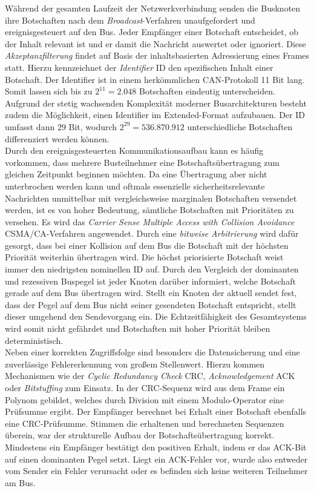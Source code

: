 Während der gesamten Laufzeit der Netzwerkverbindung senden die Busknoten ihre Botschaften nach dem \emph{Broadcast}-Verfahren unaufgefordert und ereignisgesteuert auf den Bus. Jeder Empfänger einer Botschaft entscheidet, ob der Inhalt relevant ist und er damit die Nachricht auswertet oder ignoriert. Diese \emph{Akzeptanzfilterung} findet auf Basis der inhaltsbasierten Adressierung eines Frames statt. Hierzu kennzeichnet der \emph{Identifier} \acs{ID} den spezifischen Inhalt einer Botschaft. Der Identifier ist in einem herkömmlichen \acs{CAN}-Protokoll 11 Bit lang. Somit lassen sich bis zu $2^{11} = 2.048$ Botschaften eindeutig unterscheiden. Aufgrund der stetig wachsenden Komplexität moderner Busarchitekturen besteht zudem die Möglichkeit, einen Identifier im Extended-Format aufzubauen. Der \acs{ID} umfasst dann 29 Bit, wodurch $2^{29} = 536.870.912$ unterschiedliche Botschaften differenziert werden können.\\
Durch den ereignisgesteuerten Kommunikationsaufbau kann es häufig vorkommen, dass mehrere Busteilnehmer eine Botschaftsübertragung zum gleichen Zeitpunkt beginnen möchten. Da eine Übertragung aber nicht unterbrochen werden kann und oftmals essenzielle sicherheitsrelevante Nachrichten unmittelbar mit vergleichsweise marginalen Botschaften versendet werden, ist es von hoher Bedeutung, sämtliche Botschaften mit Prioritäten zu versehen. Es wird das \emph{Carrier Sense Multiple Access with Collision Avoidance} \acs{CSMA/CA}-Verfahren angewendet. Durch eine \emph{bitweise Arbitrierung} wird dafür gesorgt, dass bei einer Kollision auf dem Bus die Botschaft mit der höchsten Priorität weiterhin übertragen wird. Die höchst priorisierte Botschaft weist immer den niedrigsten nominellen \acs{ID} auf. Durch den Vergleich der dominanten und rezessiven Buspegel ist jeder Knoten darüber informiert, welche Botschaft gerade auf dem Bus übertragen wird. Stellt ein Knoten der aktuell sendet fest, dass der Pegel auf dem Bus nicht seiner gesendeten Botschaft entspricht, stellt dieser umgehend den Sendevorgang ein. Die Echtzeitfähigkeit des Gesamtsystems wird somit nicht gefährdet und Botschaften mit hoher Priorität bleiben deterministisch. \\
Neben einer korrekten Zugriffsfolge sind besonders die Datensicherung und eine zuverlässige Fehlererkennung von großem Stellenwert. Hierzu kommen Mechanismen wie der \emph{Cyclic Redundancy Check} \acs{CRC}, \emph{Acknowledgement} \acs{ACK} oder \emph{Bitstuffing} zum Einsatz. In der \acs{CRC}-Sequenz wird aus dem Frame ein Polynom gebildet, welches durch Division mit einem Modulo-Operator eine Prüfsumme ergibt. Der Empfänger berechnet bei Erhalt einer Botschaft ebenfalls eine \acs{CRC}-Prüfsumme. Stimmen die erhaltenen und berechneten Sequenzen überein, war der strukturelle Aufbau der Botschaftsübertragung korrekt. Mindestens ein Empfänger bestätigt den positiven Erhalt, indem er das \acs{ACK}-Bit auf einen dominanten Pegel setzt. Liegt ein \acs{ACK}-Fehler vor, wurde also entweder vom Sender ein Fehler verursacht oder es befinden sich keine weiteren Teilnehmer am Bus.\\
